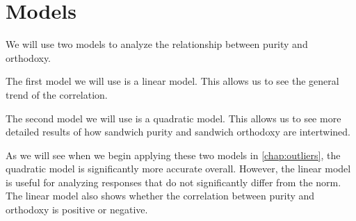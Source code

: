 \chapter{Models}

We will use two models to analyze the relationship between purity and orthodoxy.

The first model we will use is a linear model.
This allows us to see the general trend of the correlation.

The second model we will use is a quadratic model.
This allows us to see more detailed results of how sandwich purity and sandwich orthodoxy are intertwined.

As we will see when we begin applying these two models in \vref{chap:outliers}, the quadratic model is significantly more accurate overall.
However, the linear model is useful for analyzing responses that do not significantly differ from the norm.
The linear model also shows whether the correlation between purity and orthodoxy is positive or negative.
